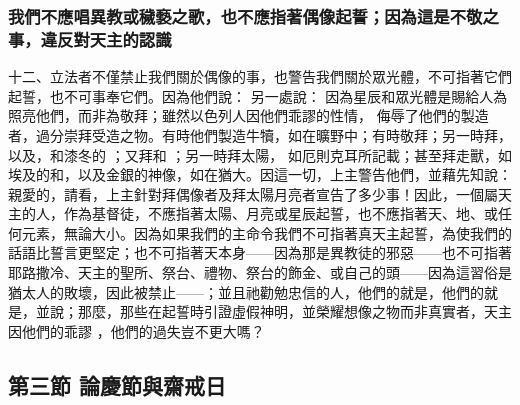
\subsubsection{我們不應唱異教或穢褻之歌，也不應指著偶像起誓；因為這是不敬之事，違反對天主的認識}

十二、立法者不僅禁止我們關於偶像的事，也警告我們關於眾光體，不可指著它們起誓，也不可事奉它們。因為他們說： 另一處說： 因為星辰和眾光體是賜給人為照亮他們，而非為敬拜；雖然以色列人因他們乖謬的性情， 侮辱了他們的製造者，過分崇拜受造之物。有時他們製造牛犢，如在曠野中；有時敬拜；另一時拜，以及，和漆冬的 ；又拜和 ；另一時拜太陽， 如厄則克耳所記載；甚至拜走獸，如埃及的和，以及金銀的神像，如在猶大。因這一切，上主警告他們，並藉先知說：  親愛的，請看，上主針對拜偶像者及拜太陽月亮者宣告了多少事！因此，一個屬天主的人，作為基督徒，不應指著太陽、月亮或星辰起誓，也不應指著天、地、或任何元素，無論大小。因為如果我們的主命令我們不可指著真天主起誓，為使我們的話語比誓言更堅定；也不可指著天本身——因為那是異教徒的邪惡——也不可指著耶路撒冷、天主的聖所、祭台、禮物、祭台的飾金、或自己的頭——因為這習俗是猶太人的敗壞，因此被禁止——；並且祂勸勉忠信的人，他們的就是，他們的就是，並說；那麼，那些在起誓時引證虛假神明，並榮耀想像之物而非真實者，天主因他們的乖謬 ，他們的過失豈不更大嗎？\par


\subsection{第三節 論慶節與齋戒日}


